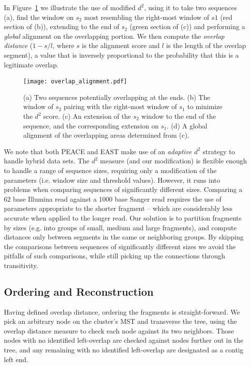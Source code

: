 \documentclass[10pt]{bmc_article}
\newcommand{\peace} {{\small PEACE}}
\newcommand{\east} {{\small EAST}}
\newenvironment{bmcformat}{\begin{raggedright}\baselineskip20pt\sloppy\setboolean{publ}{false}}{\end{raggedright}\baselineskip20pt\sloppy}
\begin{document}
\begin{bmcformat}
\vspace{3mm}

In Figure~\ref{fig:overlap} we illustrate the use of modified $d^2$,
using it to take two sequences (a), find the window on $s_2$ most
resembling the right-most window of $s1$ (red section of (b)),
extending to the end of $s_2$ (green section of (c)) and performing a
{\it global} alignment on the overlapping portion.  We then compute the
{\it overlap distance} ($1 - s/l$, where $s$ is the alignment score and
$l$ is the length of the overlap segment), a value that is inversely
proportional to the probability that this is a legitimate overlap.

\begin{figure}
\centerline{\texttt{[image: overlap\_alignment.pdf]}}
\caption{(a) Two sequences potentially overlapping at the ends.  (b)
  The window of $s_2$ pairing with the right-most window of $s_1$ to
  minimize the $d^2$ score.  (c) An extension of the $s_2$ window to
  the end of the sequence, and the corresponding extension on $s_1$.
  (d) A global alignment of the overlapping areas determined from
  (c).}\label{fig:overlap}
\end{figure}


We note that both \peace\/ and \east\/ make use of an {\it adaptive
  $d^2$} strategy to handle hybrid data sets.  The $d^2$ measure (and
our modification) is flexible enough to handle a range of sequence
sizes, requiring only a modification of the parameters (i.e. window
size and threshold values).  However, it runs into problems when
comparing sequences of significantly different sizes.  Comparing a 62
base Illumina read against a 1000 base Sanger read requires the use of
parameters appropriate to the shorter fragment -- which are
considerably less accurate when applied to the longer read.  Our
solution is to partition fragments by sizes (e.g. into groups of
small, medium and large fragments), and compute distances only
between segments in the same or neighboring groups.  By skipping the
comparisons between sequences of significantly different sizes we
avoid the pitfalls of such comparisons, while still picking up the
connections through transitivity.

\subsection*{Ordering and Reconstruction}

Having defined overlap distance, ordering the fragments is
straight-forward.  We pick an arbitrary node on the cluster's MST and
transverse the tree, using the overlap distance measure to check each
node against its two neighbors.  Those nodes with no identified
left-overlap are checked against nodes further out in the tree, and
any remaining with no identified left-overlap are designated as a contig
left end.


\end{bmcformat}
\end{document}
